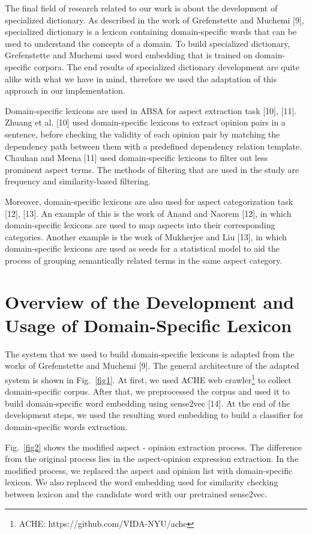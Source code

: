 \documentclass[a4paper,conference]{IEEEtran}
\begin{document}
The final field of research related to our work is about the development of specialized dictionary. As described in the work of Grefenstette and Muchemi [9], specialized dictionary is a lexicon containing domain-specific words that can be used to understand the concepts of a domain. To build specialized dictionary, Grefenstette and Muchemi used word embedding that is trained on domain-specific corpora. The end results of specialized dictionary development are quite alike with what we have in mind, therefore we used the adaptation of this approach in our implementation.

Domain-specific lexicons are used in ABSA for aspect extraction task [10], [11]. Zhuang et al. [10] used domain-specific lexicons to extract opinion pairs in a sentence, before checking the validity of each opinion pair by matching the dependency path between them with a predefined dependency relation template. Chauhan and Meena [11] used domain-specific lexicons to filter out less prominent aspect terms. The methods of filtering that are used in the study are frequency and similarity-based filtering.

Moreover, domain-specific lexicons are also used for aspect categorization task [12], [13]. An example of this is the work of Anand and Naorem [12], in which domain-specific lexicons are used to map aspects into their corresponding categories. Another example is the work of Mukherjee and Liu [13], in which domain-specific lexicons are used as seeds for a statistical model to aid the process of grouping semantically related terms in the same aspect category.

\section{Overview of the Development and Usage of Domain-Specific Lexicon}
The system that we used to build domain-specific lexicons is adapted from the works of Grefenstette and Muchemi [9]. The general architecture of the adapted system is shown in Fig.~\ref{fig1}. At first, we used ACHE web crawler\footnote{ACHE: https://github.com/VIDA-NYU/ache} to collect domain-specific corpus. After that, we preprocessed the corpus and used it to build domain-specific word embedding using sense2vec [14]. At the end of the development steps, we used the resulting word embedding to build a classifier for domain-specific words extraction.

Fig.~\ref{fig2} shows the modified aspect - opinion extraction process. The difference from the original process lies in the aspect-opinion expression extraction. In the modified process, we replaced the aspect and opinion list with domain-specific lexicon. We also replaced the word embedding used for similarity checking between lexicon and the candidate word with our pretrained sense2vec.
\end{document}
